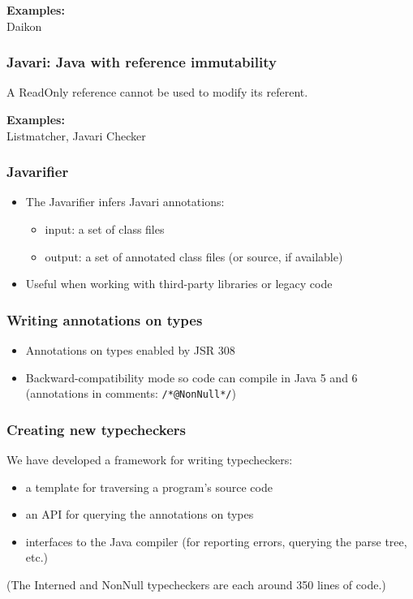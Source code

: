 \documentclass{beamer}
\begin{document}
\frame
{
  \begin{center}
  {\bf\large Examples:} \\ Daikon
  \end{center}
}


\frame
{
  \frametitle{Javari: Java with reference immutability}

  A ReadOnly reference cannot be used to modify its referent.

  \begin{center}
  \end{center} 
}

\frame
{
  \begin{center}
  {\bf\large Examples:} \\ Listmatcher, Javari Checker
  \end{center}
}

\frame
{
  \frametitle{Javarifier}

  \begin{itemize}
  \item The Javarifier infers Javari annotations:

  \begin{itemize}
  \item input: a set of class files
  \item output: a set of annotated class files (or source, if available)
  \end{itemize}

  \item Useful when working with third-party libraries or legacy code
  \end{itemize}

}


\frame
{
  \frametitle{Writing annotations on types}

  \begin{itemize}
  \item Annotations on types enabled by JSR 308
  \item Backward-compatibility mode so code can compile in Java 5 and 6
  (annotations in comments: \texttt{/*@NonNull*/})
  \end{itemize}
}

\frame
{
  \frametitle{Creating new typecheckers}

  We have developed a framework for writing typecheckers:
  \begin{itemize}
  \item a template for traversing a program's source code
  \item an API for querying the annotations on types
  \item interfaces to the Java compiler (for reporting errors, querying the
        parse tree, etc.)
  \end{itemize}

  (The Interned and NonNull typecheckers are each around 350 lines of code.)

}
\end{document}
